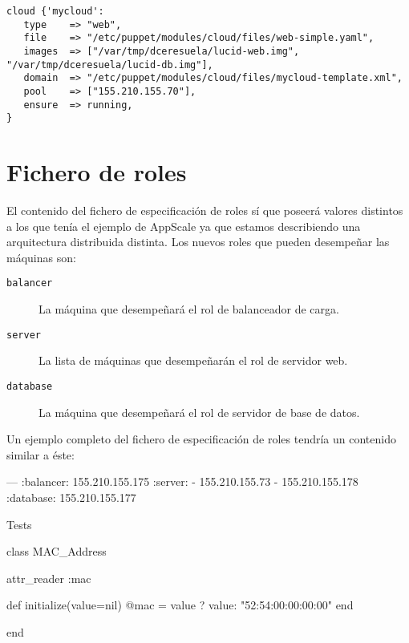 \begin{lstlisting}
cloud {'mycloud':
   type    => "web",
   file    => "/etc/puppet/modules/cloud/files/web-simple.yaml",
   images  => ["/var/tmp/dceresuela/lucid-web.img", "/var/tmp/dceresuela/lucid-db.img"],
   domain  => "/etc/puppet/modules/cloud/files/mycloud-template.xml",
   pool    => ["155.210.155.70"],
   ensure  => running,
}
\end{lstlisting}

\section{Fichero de roles}

El contenido del fichero de especificación de roles sí que poseerá valores distintos a los que tenía el ejemplo de AppScale ya que estamos describiendo una arquitectura distribuida distinta. Los nuevos roles que pueden desempeñar las máquinas son:
\begin{description}
\item[\texttt{balancer}] La máquina que desempeñará el rol de balanceador de carga.
\item[\texttt{server}] La lista de máquinas que desempeñarán el rol de servidor web.
\item[\texttt{database}] La máquina que desempeñará el rol de servidor de base de datos.
\end{description}

Un ejemplo completo del fichero de especificación de roles tendría un contenido similar a éste:
\begin{yamlcode}
--- 
:balancer: 155.210.155.175
:server:
- 155.210.155.73
- 155.210.155.178
:database: 155.210.155.177
\end{yamlcode}



Tests
\begin{rubycode}
class MAC_Address
   
   attr_reader :mac
   
   def initialize(value=nil)
      @mac = value ? value: "52:54:00:00:00:00"
   end
   
   
end
\end{rubycode}
